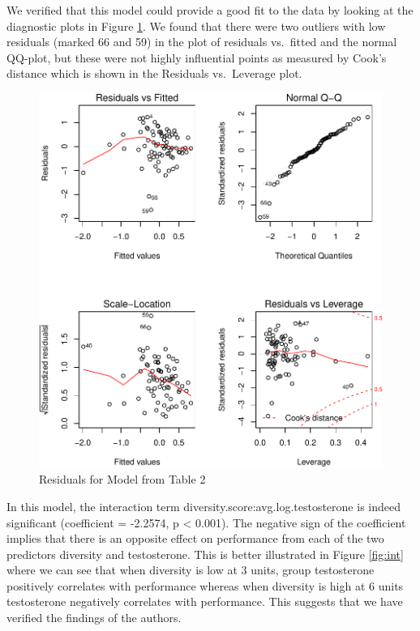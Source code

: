 \documentclass[]{article}
\begin{document}
We verified that this model could provide a good fit to the data by
looking at the diagnostic plots in Figure \ref{fig:x}. We found that
there were two outliers with low residuals (marked 66 and 59) in the
plot of residuals vs.~fitted and the normal QQ-plot, but these were not
highly influential points as measured by Cook's distance which is shown
in the Residuals vs.~Leverage plot.

\begin{figure}
\centering
\includegraphics{19_10_27_hw7_q1_files/figure-latex/unnamed-chunk-3-1.pdf}
\caption{\label{fig:x} Residuals for Model from Table 2}
\end{figure}

In this model, the interaction term diversity.score:avg.log.testosterone
is indeed significant (coefficient = -2.2574, p \textless{} 0.001). The
negative sign of the coefficient implies that there is an opposite
effect on performance from each of the two predictors diversity and
testosterone. This is better illustrated in Figure \ref{fig:int} where
we can see that when diversity is low at 3 units, group testosterone
positively correlates with performance whereas when diversity is high at
6 units testosterone negatively correlates with performance. This
suggests that we have verified the findings of the authors.
\end{document}
